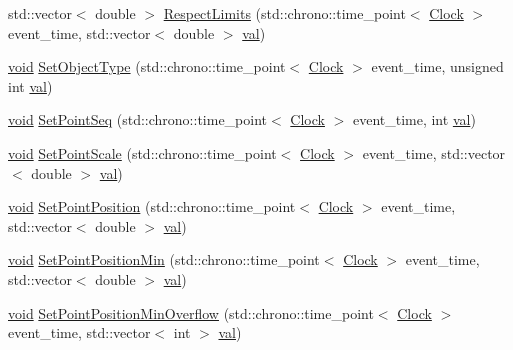 \begin{DoxyCompactItemize}
\item 
std\+::vector$<$ double $>$ \mbox{\hyperlink{class_point_ac3e94cb7e2ab1d6008ff1d5df00641c2}{Respect\+Limits}} (std\+::chrono\+::time\+\_\+point$<$ \mbox{\hyperlink{universe_8h_a0ef8d951d1ca5ab3cfaf7ab4c7a6fd80}{Clock}} $>$ event\+\_\+time, std\+::vector$<$ double $>$ \mbox{\hyperlink{glad_8h_a26942fd2ed566ef553eae82d2c109c8f}{val}})
\item 
\mbox{\hyperlink{glad_8h_a950fc91edb4504f62f1c577bf4727c29}{void}} \mbox{\hyperlink{class_point_a3afeb2d7a2e2b7d9406a57fefa1af2ee}{Set\+Object\+Type}} (std\+::chrono\+::time\+\_\+point$<$ \mbox{\hyperlink{universe_8h_a0ef8d951d1ca5ab3cfaf7ab4c7a6fd80}{Clock}} $>$ event\+\_\+time, unsigned int \mbox{\hyperlink{glad_8h_a26942fd2ed566ef553eae82d2c109c8f}{val}})
\item 
\mbox{\hyperlink{glad_8h_a950fc91edb4504f62f1c577bf4727c29}{void}} \mbox{\hyperlink{class_point_a912aefb007184f73b86c37257a415237}{Set\+Point\+Seq}} (std\+::chrono\+::time\+\_\+point$<$ \mbox{\hyperlink{universe_8h_a0ef8d951d1ca5ab3cfaf7ab4c7a6fd80}{Clock}} $>$ event\+\_\+time, int \mbox{\hyperlink{glad_8h_a26942fd2ed566ef553eae82d2c109c8f}{val}})
\item 
\mbox{\hyperlink{glad_8h_a950fc91edb4504f62f1c577bf4727c29}{void}} \mbox{\hyperlink{class_point_a8fc02455a773624df80933403b0e545f}{Set\+Point\+Scale}} (std\+::chrono\+::time\+\_\+point$<$ \mbox{\hyperlink{universe_8h_a0ef8d951d1ca5ab3cfaf7ab4c7a6fd80}{Clock}} $>$ event\+\_\+time, std\+::vector$<$ double $>$ \mbox{\hyperlink{glad_8h_a26942fd2ed566ef553eae82d2c109c8f}{val}})
\item 
\mbox{\hyperlink{glad_8h_a950fc91edb4504f62f1c577bf4727c29}{void}} \mbox{\hyperlink{class_point_a9191f97ece64b8385140d5f800a3a4ca}{Set\+Point\+Position}} (std\+::chrono\+::time\+\_\+point$<$ \mbox{\hyperlink{universe_8h_a0ef8d951d1ca5ab3cfaf7ab4c7a6fd80}{Clock}} $>$ event\+\_\+time, std\+::vector$<$ double $>$ \mbox{\hyperlink{glad_8h_a26942fd2ed566ef553eae82d2c109c8f}{val}})
\item 
\mbox{\hyperlink{glad_8h_a950fc91edb4504f62f1c577bf4727c29}{void}} \mbox{\hyperlink{class_point_ad47980a6ed515a2def172d757af46f1a}{Set\+Point\+Position\+Min}} (std\+::chrono\+::time\+\_\+point$<$ \mbox{\hyperlink{universe_8h_a0ef8d951d1ca5ab3cfaf7ab4c7a6fd80}{Clock}} $>$ event\+\_\+time, std\+::vector$<$ double $>$ \mbox{\hyperlink{glad_8h_a26942fd2ed566ef553eae82d2c109c8f}{val}})
\item 
\mbox{\hyperlink{glad_8h_a950fc91edb4504f62f1c577bf4727c29}{void}} \mbox{\hyperlink{class_point_ab0c0a837abb8bd52a59f82723a31f61f}{Set\+Point\+Position\+Min\+Overflow}} (std\+::chrono\+::time\+\_\+point$<$ \mbox{\hyperlink{universe_8h_a0ef8d951d1ca5ab3cfaf7ab4c7a6fd80}{Clock}} $>$ event\+\_\+time, std\+::vector$<$ int $>$ \mbox{\hyperlink{glad_8h_a26942fd2ed566ef553eae82d2c109c8f}{val}})

\end{DoxyCompactItemize}
